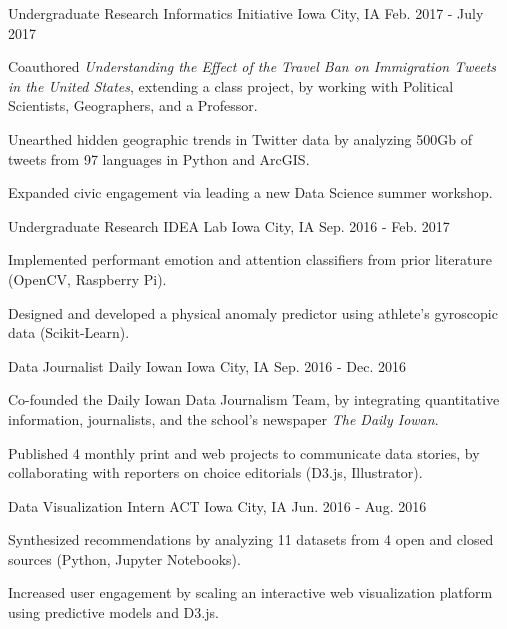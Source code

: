 \begin{cventries}
\cventry
  {Undergraduate Research}
  {Informatics Initiative}
  {Iowa City, IA}
  {Feb. 2017 - July 2017}
  {
    \begin{cvitems}
      \item {Coauthored \textit{Understanding the Effect of the Travel Ban on Immigration Tweets in the United States}, extending a class project, by working with Political Scientists, Geographers, and a Professor.}
      \item {Unearthed hidden geographic trends in Twitter data by analyzing 500Gb of tweets from 97 languages in Python and ArcGIS.}
      \item {Expanded civic engagement via leading a new Data Science summer workshop.}
    \end{cvitems}
  }
  \cventry
    {Undergraduate Research}
    {IDEA Lab}
    {Iowa City, IA}
    {Sep. 2016 - Feb. 2017}
    {
      \begin{cvitems}
        \item{Implemented performant emotion and attention classifiers from prior literature (OpenCV, Raspberry Pi).}
        \item {Designed and developed a physical anomaly predictor using athlete's gyroscopic data (Scikit-Learn). }
      \end{cvitems}
    }
  \cventry
    {Data Journalist}
    {Daily Iowan}
    {Iowa City, IA}
    {Sep. 2016 - Dec. 2016}
    {
      \begin{cvitems}
        \item {Co-founded the Daily Iowan Data Journalism Team, by integrating quantitative information, journalists, and the school's newspaper \textit{The Daily Iowan}.}
        \item {Published 4 monthly print and web projects to communicate data stories, by collaborating with reporters on choice editorials (D3.js, Illustrator).}
      \end{cvitems}
    }
  \cventry
    {Data Visualization Intern}
    {ACT}
    {Iowa City, IA}
    {Jun. 2016 - Aug. 2016}
    {
      \begin{cvitems}
        \item {Synthesized recommendations by analyzing 11 datasets from 4 open and closed sources (Python, Jupyter Notebooks). }
        \item {Increased user engagement by scaling an interactive web visualization platform using predictive models and D3.js.}
      \end{cvitems}
}
\end{cventries}
